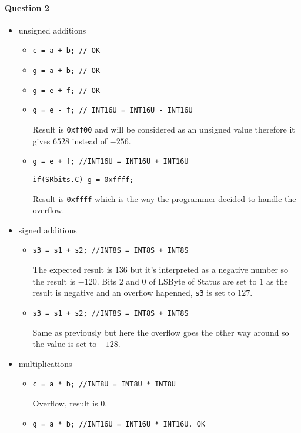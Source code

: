 \documentclass[10pt]{article}
\begin{document}
\paragraph{Question 2}
\begin{itemize}
\item unsigned additions
	\begin{itemize}
	\item \verb!c = a + b; // OK!
	\item \verb!g = a + b; // OK!
	\item \verb!g = e + f; // OK!
	\item \verb!g = e - f; // INT16U = INT16U - INT16U!

	Result is \verb!0xff00! and will be considered as an unsigned value therefore it gives $6528$ instead of $-256$.

	\item \verb!g = e + f; //INT16U = INT16U + INT16U!

	\verb!if(SRbits.C) g = 0xffff;!

	Result is \verb!0xffff! which is the way the programmer decided to handle the overflow.

	\end{itemize}

\item signed additions
	\begin{itemize}
	\item \verb!s3 = s1 + s2; //INT8S = INT8S + INT8S!

	The expected result is $136$ but it's interpreted as a negative number so the result is $-120$. Bits $2$ and $0$ of LSByte of Status are set to $1$ as the result is negative and an overflow hapenned, \verb!s3! is set to $127$.

	\item \verb!s3 = s1 + s2; //INT8S = INT8S + INT8S!

	Same as previously but here the overflow goes the other way around so the value is set to $-128$.
	\end{itemize}


\item multiplications
	\begin{itemize}
	\item \verb!c = a * b; //INT8U = INT8U * INT8U!

	Overflow, result is $0$.

	\item \verb!g = a * b; //INT16U = INT16U * INT16U. OK!


\end{itemize}
\end{itemize}
\end{document}
